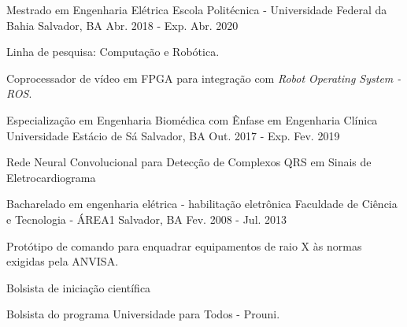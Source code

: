 

\begin{cventries}

  \cventry
    {Mestrado em Engenharia Elétrica} %
    {Escola Politécnica - Universidade Federal da Bahia} %
    {Salvador, BA} %
    {Abr. 2018 - Exp. Abr. 2020} %
    {
      \begin{cvitems} %
        \item {Linha de pesquisa: Computação e Robótica.}
        \item {Coprocessador de vídeo em FPGA para integração com \textit{Robot Operating System - ROS}.}
      \end{cvitems}
    }


  \cventry
    {Especialização em Engenharia Biomédica com Ênfase em Engenharia Clínica} %
    {Universidade Estácio de Sá} %
    {Salvador, BA} %
    {Out. 2017 - Exp. Fev. 2019} %
    {
      \begin{cvitems} %
        \item {Rede Neural Convolucional para Detecção de Complexos QRS em Sinais de Eletrocardiograma}
      \end{cvitems}
    }


  \cventry
    {Bacharelado em engenharia elétrica - habilitação eletrônica} %
    {Faculdade de Ciência e Tecnologia - ÁREA1} %
    {Salvador, BA} %
    {Fev. 2008 - Jul. 2013} %
    {
      \begin{cvitems} %
        \item {Protótipo de comando para enquadrar equipamentos de raio X às normas exigidas pela ANVISA.}
        \item {Bolsista de iniciação científica}
        \item {Bolsista do programa Universidade para Todos - Prouni.}
      \end{cvitems}
    }


\end{cventries}
